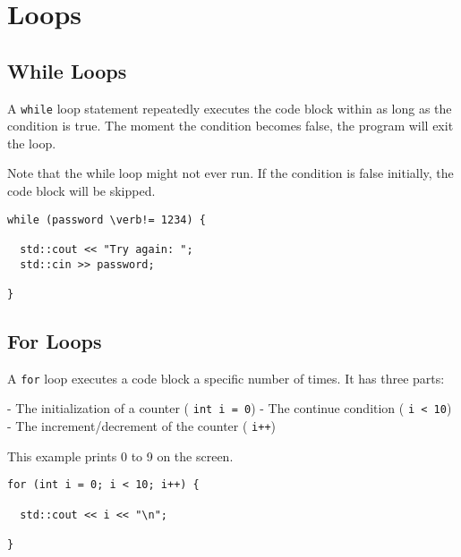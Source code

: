 \chapter{Loops}
\section{While Loops}
A \verb!while! loop statement repeatedly executes the code block within as long as the condition is true. 
The moment the condition becomes false, the program will exit the loop.

Note that the while loop might not ever run. If the condition is false initially, the code block will be skipped.

\begin{verbatim}
while (password \verb!= 1234) {
 
  std::cout << "Try again: ";
  std::cin >> password;
 
}    
\end{verbatim}

\section{For Loops}
A \verb!for! loop executes a code block a specific number of times. It has three parts:

- The initialization of a counter ( \verb!int i = 0!)
- The continue condition ( \verb!i < 10!)
- The increment/decrement of the counter ( \verb!i++!)  


This example prints 0 to 9 on the screen.
\begin{verbatim}
for (int i = 0; i < 10; i++) {
  
  std::cout << i << "\n";
  
}    
\end{verbatim}

